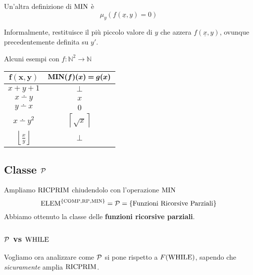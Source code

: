 Un'altra definizione di $\operatorname{MIN}$ è 
$$ \mu_y (f(\underline{x}, y) = 0)$$

Informalmente, restituisce il più piccolo valore di $y$ che azzera $f(\underline{x},y)$, ovunque precedentemente definita su $y'$.

Alcuni esempi con $f: \mathbb{N}^2 \rightarrow \mathbb{N}$
\begin{center}
	\begin{tabular}{c|c}
		$\bm{f(x,y)}$ & $\bm{\MIN(f)(x)=g(x)}$ \\ 
		\hline
		$x+y+1$ & $\bot$\\
		$x \dotminus y$ & $x$\\
		$y \dotminus x$ & $0$\\
		$x \dotminus y^2$ & $\left\lceil\sqrt{x}\right\rceil$\\
		$\left\lfloor\frac{x}{y}\right\rfloor$ & $\bot$\\
	\end{tabular}
\end{center}

\subsection{Classe $\mathcal{P}$}
Ampliamo $\text{RICPRIM}$ chiudendolo con l'operazione $\operatorname{MIN}$
$$ \text{ELEM}^{\{\text{COMP}, \text{RP}, \operatorname{MIN}\}} = \mathcal{P} = \{\text{Funzioni Ricorsive Parziali}\}$$
Abbiamo ottenuto la classe delle \textbf{funzioni ricorsive parziali}.

\subsubsection{$\mathcal{P}$ vs $\text{WHILE}$}

Vogliamo ora analizzare come $\mathcal{P}$ si pone rispetto a $F(\text{WHILE})$, sapendo che \textit{sicuramente} amplia $\text{RICPRIM}$.\\

